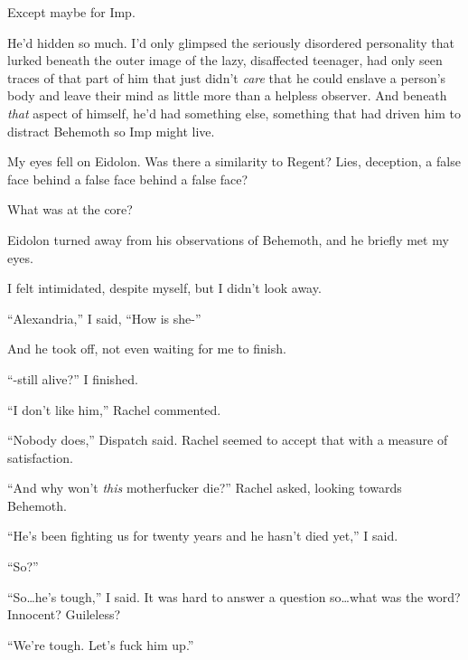 Except maybe for Imp.



He'd hidden so much.  I'd only glimpsed the seriously disordered personality that lurked beneath the outer image of the lazy, disaffected teenager, had only seen traces of that part of him that just didn't \emph{care} that he could enslave a person's body and leave their mind as little more than a helpless observer.  And beneath \emph{that }aspect of himself, he'd had something else, something that had driven him to distract Behemoth so Imp might live.



My eyes fell on Eidolon.  Was there a similarity to Regent?  Lies, deception, a false face behind a false face behind a false face?



What was at the core?



Eidolon turned away from his observations of Behemoth, and he briefly met my eyes.



I felt intimidated, despite myself, but I didn't look away.



``Alexandria,'' I said, ``How is she-''



And he took off, not even waiting for me to finish.



``-still alive?'' I finished.



``I don't like him,'' Rachel commented.



``Nobody does,'' Dispatch said.  Rachel seemed to accept that with a measure of satisfaction.



``And why won't \emph{this} motherfucker die?'' Rachel asked, looking towards Behemoth.



``He's been fighting us for twenty years and he hasn't died yet,'' I said.



``So?''



``So\ldots he's tough,'' I said.  It was hard to answer a question so\ldots what was the word?  Innocent?  Guileless?



``We're tough.  Let's fuck him up.''




